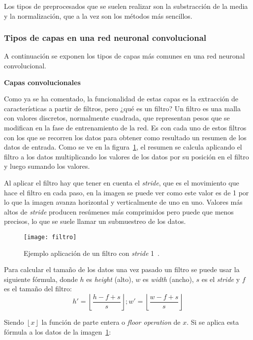 Los tipos de preprocesados que se suelen realizar son la substracción de la media y la normalización, que a la vez son los métodos más sencillos.

\subsubsection{Tipos de capas en una red neuronal convolucional}
A continuación se exponen los tipos de capas más comunes en una red neuronal convolucional.

\textbf{Capas convolucionales}

Como ya se ha comentado, la funcionalidad de estas capas es la extracción de características a partir de filtros, pero ¿qué es un filtro? Un filtro es una malla con valores discretos, normalmente cuadrada, que representan pesos que se modifican en la fase de entrenamiento de la red. Es con cada uno de estos filtros con los que se recorren los datos para obtener como resultado un resumen de los datos de entrada. Como se ve en la figura~\ref{fig:filtro}, el resumen se calcula aplicando el filtro a los datos multiplicando los valores de los datos por su posición en el filtro y luego sumando los valores.

Al aplicar el filtro hay que tener en cuenta el \textit{stride}, que es el movimiento que hace el filtro en cada paso, en la imagen se puede ver como este valor es de 1 por lo que la imagen avanza horizontal y verticalmente de uno en uno. Valores más altos de \textit{stride} producen resúmenes más comprimidos pero puede que menos precisos, lo que se suele llamar un submuestreo de los datos.

\begin{figure}[h]
	\centering
	\texttt{[image: filtro]}
	\caption[Ejemplo aplicación de un filtro con \textit{stride} 1.]{Ejemplo aplicación de un filtro con \textit{stride} 1~\cite{cnn}.}
	\label{fig:filtro}
\end{figure}

Para calcular el tamaño de los datos una vez pasado un filtro se puede usar la siguiente fórmula, donde $h$ es \textit{height} (alto), $w$ es \textit{width} (ancho), $s$ es el \textit{stride} y $f$ es el tamaño del filtro:
\begin{equation}
h'=\left \lfloor \frac{h-f+s}{s} \right \rfloor; w'= \left \lfloor \frac{w-f+s}{s} \right \rfloor
\end{equation}

Siendo $\left \lfloor x  \right \rfloor$ la función de parte entera o \textit{floor operation} de $x$. Si se aplica esta fórmula a los datos de la imagen~\ref{fig:filtro}:


